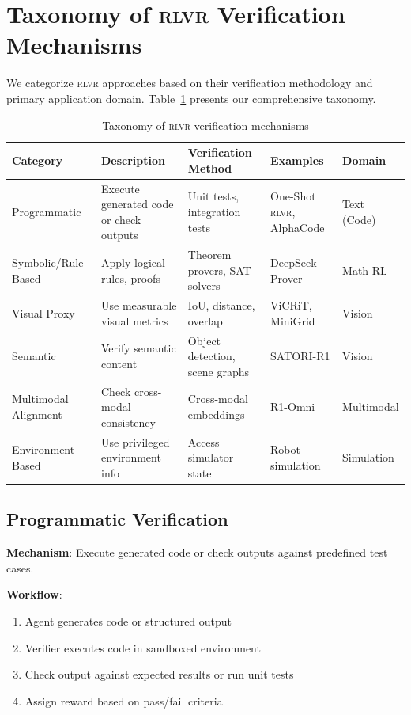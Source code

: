 \documentclass[11pt,a4paper]{article}
\newcommand{\rlvr}{\textsc{rlvr}}
\begin{document}
\section{Taxonomy of \rlvr{} Verification Mechanisms}
\label{sec:taxonomy}

We categorize \rlvr{} approaches based on their verification methodology and primary application domain. Table~\ref{tab:taxonomy} presents our comprehensive taxonomy.

\begin{table}[t]
\centering
\caption{Taxonomy of \rlvr{} verification mechanisms}
\label{tab:taxonomy}
\small
\begin{tabular}{@{}p{3cm}p{4cm}p{3cm}p{2.5cm}p{2cm}@{}}
\toprule
\textbf{Category} & \textbf{Description} & \textbf{Verification Method} & \textbf{Examples} & \textbf{Domain} \\
\midrule
Programmatic & Execute generated code or check outputs & Unit tests, integration tests & One-Shot \rlvr{}, AlphaCode & Text (Code) \\
\midrule
Symbolic/Rule-Based & Apply logical rules, proofs & Theorem provers, SAT solvers & DeepSeek-Prover & Math RL \\
\midrule
Visual Proxy & Use measurable visual metrics & IoU, distance, overlap & ViCRiT, MiniGrid & Vision \\
\midrule
Semantic & Verify semantic content & Object detection, scene graphs & SATORI-R1 & Vision \\
\midrule
Multimodal Alignment & Check cross-modal consistency & Cross-modal embeddings & R1-Omni & Multimodal \\
\midrule
Environment-Based & Use privileged environment info & Access simulator state & Robot simulation & Simulation \\
\bottomrule
\end{tabular}
\end{table}

\subsection{Programmatic Verification}
\label{sec:programmatic}

\textbf{Mechanism}: Execute generated code or check outputs against predefined test cases.

\textbf{Workflow}:
\begin{enumerate}[leftmargin=*]
    \item Agent generates code or structured output
    \item Verifier executes code in sandboxed environment
    \item Check output against expected results or run unit tests
    \item Assign reward based on pass/fail criteria
\end{enumerate}
\end{document}
